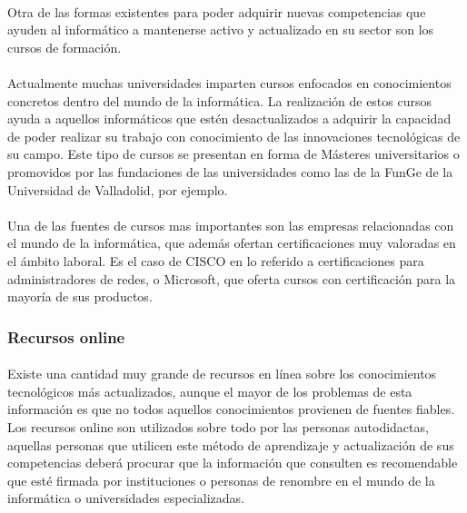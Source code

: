 \documentclass[12pt, a4paper]{report}
\begin{document}
        		\paragraph{}
               	Otra de las formas existentes para poder adquirir nuevas competencias que ayuden al informático a mantenerse activo y actualizado en su sector son los cursos de formación.
                
                \paragraph{}
                Actualmente muchas universidades imparten cursos enfocados en conocimientos concretos dentro del mundo de la informática. La realización de estos cursos ayuda a aquellos informáticos que estén desactualizados a adquirir la capacidad de poder realizar su trabajo con conocimiento de las innovaciones tecnológicas de su campo. Este tipo de cursos se presentan en forma de Másteres universitarios o promovidos por las fundaciones de las universidades como las de la FunGe de la Universidad de Valladolid, por ejemplo.
                
                \paragraph{}
				Una de las fuentes de cursos mas importantes son las empresas relacionadas con el mundo de la informática, que además ofertan certificaciones muy valoradas en el ámbito laboral. Es el caso de CISCO en lo referido a certificaciones para administradores de redes, o Microsoft, que oferta cursos con certificación para la mayoría de sus productos\cite{microsoft:cursos}.
        	
    		\subsubsection{Recursos online}
        		\paragraph{}
        		Existe una cantidad muy grande de recursos en línea sobre los conocimientos tecnológicos más actualizados, aunque el mayor de los problemas de esta información es que no todos aquellos conocimientos provienen de fuentes fiables. Los recursos online son utilizados sobre todo por las personas autodidactas, aquellas personas que utilicen este método de aprendizaje y actualización de sus competencias deberá procurar que la información que consulten es recomendable que esté firmada por instituciones o personas de renombre en el mundo de la informática o universidades especializadas.
            
\end{document}
